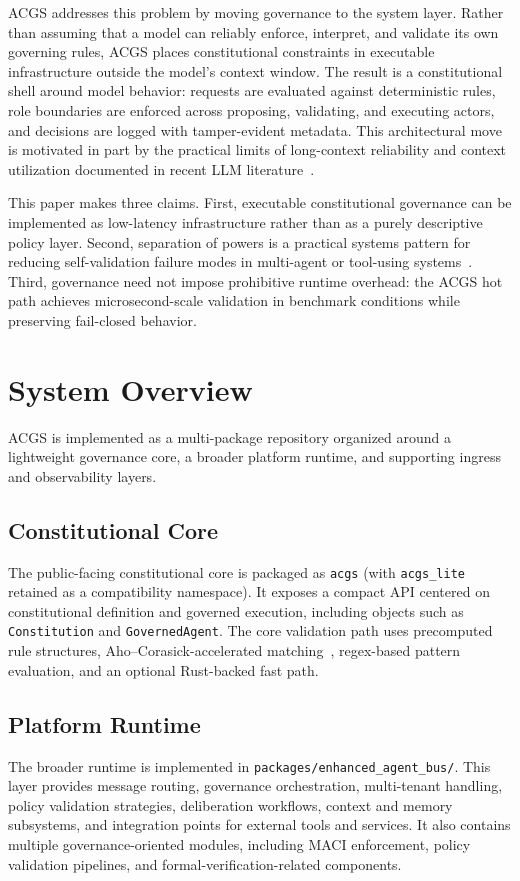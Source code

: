 \documentclass[11pt]{article}
\begin{document}
ACGS addresses this problem by moving governance to the system layer. Rather than assuming that a model can reliably enforce, interpret, and validate its own governing rules, ACGS places constitutional constraints in executable infrastructure outside the model's context window. The result is a constitutional shell around model behavior: requests are evaluated against deterministic rules, role boundaries are enforced across proposing, validating, and executing actors, and decisions are logged with tamper-evident metadata. This architectural move is motivated in part by the practical limits of long-context reliability and context utilization documented in recent LLM literature~\cite{lostinthemiddle}.

This paper makes three claims. First, executable constitutional governance can be implemented as low-latency infrastructure rather than as a purely descriptive policy layer. Second, separation of powers is a practical systems pattern for reducing self-validation failure modes in multi-agent or tool-using systems~\cite{react}. Third, governance need not impose prohibitive runtime overhead: the ACGS hot path achieves microsecond-scale validation in benchmark conditions while preserving fail-closed behavior.

\section{System Overview}
ACGS is implemented as a multi-package repository organized around a lightweight governance core, a broader platform runtime, and supporting ingress and observability layers.

\subsection{Constitutional Core}
The public-facing constitutional core is packaged as \texttt{acgs} (with \texttt{acgs\_lite} retained as a compatibility namespace). It exposes a compact API centered on constitutional definition and governed execution, including objects such as \texttt{Constitution} and \texttt{GovernedAgent}. The core validation path uses precomputed rule structures, Aho--Corasick-accelerated matching~\cite{ahocorasick}, regex-based pattern evaluation, and an optional Rust-backed fast path.

\subsection{Platform Runtime}
The broader runtime is implemented in \texttt{packages/enhanced\_agent\_bus/}. This layer provides message routing, governance orchestration, multi-tenant handling, policy validation strategies, deliberation workflows, context and memory subsystems, and integration points for external tools and services. It also contains multiple governance-oriented modules, including MACI enforcement, policy validation pipelines, and formal-verification-related components.
\end{document}
